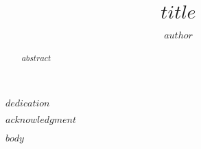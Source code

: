 \documentclass[boldheadings,thrmdefs,bbm,ams]{USFDissertation}
\title{$title$}
\author{$author$}
\begin{document}
\maketitle

\begin{dedication}
$dedication$
\end{dedication}

\begin{acknowledgment}
$acknowledgment$
\end{acknowledgment}

\tableofcontents

\listoftables

\listoffigures

\begin{abstract}
$abstract$
\end{abstract}

\dissertation

$body$

\end{document}
